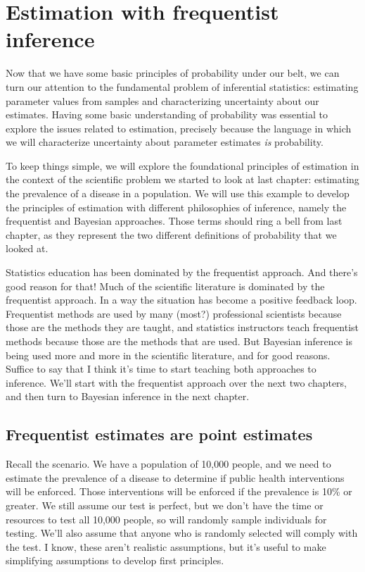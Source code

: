 \documentclass[
]{book}
\begin{document}
\chapter{Estimation with frequentist inference}\label{estimation-with-frequentist-inference}

Now that we have some basic principles of probability under our belt, we can turn our attention to the fundamental problem of inferential statistics: estimating parameter values from samples and characterizing uncertainty about our estimates. Having some basic understanding of probability was essential to explore the issues related to estimation, precisely because the language in which we will characterize uncertainty about parameter estimates \emph{is} probability.

To keep things simple, we will explore the foundational principles of estimation in the context of the scientific problem we started to look at last chapter: estimating the prevalence of a disease in a population. We will use this example to develop the principles of estimation with different philosophies of inference, namely the frequentist and Bayesian approaches. Those terms should ring a bell from last chapter, as they represent the two different definitions of probability that we looked at.

Statistics education has been dominated by the frequentist approach. And there's good reason for that! Much of the scientific literature is dominated by the frequentist approach. In a way the situation has become a positive feedback loop. Frequentist methods are used by many (most?) professional scientists because those are the methods they are taught, and statistics instructors teach frequentist methods because those are the methods that are used. But Bayesian inference is being used more and more in the scientific literature, and for good reasons. Suffice to say that I think it's time to start teaching both approaches to inference. We'll start with the frequentist approach over the next two chapters, and then turn to Bayesian inference in the next chapter.

\section{Frequentist estimates are point estimates}\label{frequentist-estimates-are-point-estimates}

Recall the scenario. We have a population of 10,000 people, and we need to estimate the prevalence of a disease to determine if public health interventions will be enforced. Those interventions will be enforced if the prevalence is 10\% or greater. We still assume our test is perfect, but we don't have the time or resources to test all 10,000 people, so will randomly sample individuals for testing. We'll also assume that anyone who is randomly selected will comply with the test. I know, these aren't realistic assumptions, but it's useful to make simplifying assumptions to develop first principles.
\end{document}
